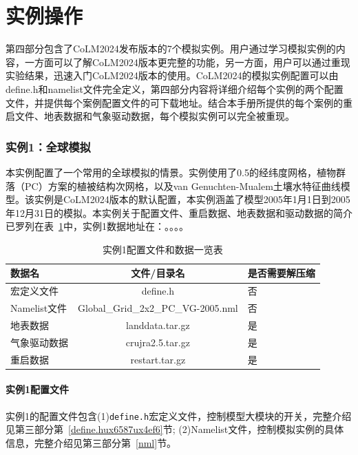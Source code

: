 \part{实例操作}

第四部分包含了CoLM2024发布版本的7个模拟实例。用户通过学习模拟实例的内容，一方面可以了解CoLM2024版本更完整的功能，另一方面，用户可以通过重现实验结果，迅速入门CoLM2024版本的使用。CoLM2024的模拟实例配置可以由define.h和namelist文件完全定义，第四部分内容将详细介绍每个实例的两个配置文件，并提供每个案例配置文件的可下载地址。结合本手册所提供的每个案例的重启文件、地表数据和气象驱动数据，每个模拟实例可以完全被重现。

\section{实例1：全球模拟}

本实例配置了一个常用的全球模拟的情景。实例使用了0.5\textdegree 的经纬度网格，植物群落（PC）方案的植被结构次网格，以及van Genuchten-Mualem土壤水特征曲线模型。该实例是CoLM2024版本的默认配置，本实例涵盖了模型2005年1月1日到2005年12月31日的模拟。本实例关于配置文件、重启数据、地表数据和驱动数据的简介已罗列在表~\ref{ex1table}中，实例1数据地址在：。。。。

\begin{table}[htbp]
\caption{实例1配置文件和数据一览表}
\centering \renewcommand{\arraystretch}{1.5}
\label{ex1table}
\begin{tabular}{lcl}
\toprule
\textbf{数据名} & \textbf{文件/目录名} & \textbf{是否需要解压缩} \\\midrule

宏定义文件 & define.h & 否 \\
Namelist文件 & Global\_Grid\_2x2\_PC\_VG-2005.nml & 否 \\
地表数据 & landdata.tar.gz & 是 \\
气象驱动数据 & crujra2.5.tar.gz & 是 \\
重启数据 & restart.tar.gz & 是 \\

\bottomrule
\end{tabular}
\end{table}
\subsection{实例1配置文件}\label{ex1config}

实例1的配置文件包含(1)\texttt{define.h}宏定义文件，控制模型大模块的开关，完整介绍见第三部分第~\ref{define.hux6587ux4ef6}节; (2)Namelist文件，控制模拟实例的具体信息，完整介绍见第三部分第~\ref{nml}节。

